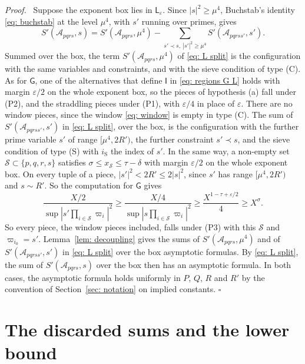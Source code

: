 \documentclass{article}
\numberwithin{equation}{section}
\newenvironment{proof}[1][Proof]{\par\medskip\noindent\textit{#1.}\ }{\hfill$\square$\par\medskip}
\newcommand{\Le}{\leqslant}
\newcommand{\Ge}{\geqslant}
\begin{document}
\begin{proof}
Suppose the exponent box lies in $\mathsf{L}_\varepsilon$. Since $|s|^2 \Ge \mu^4$, Buchstab's identity \eqref{eq: buchstab} at the level $\mu^4$, with $s'$ running over primes, gives
\begin{equation}
\label{eq: L split}
S'(\mathcal{A}_{pqrs}, s) = S'(\mathcal{A}_{pqrs}, \mu^4) - \sum_{s' \prec s,\ |s'|^2 \Ge \mu^4} S'(\mathcal{A}_{pqrss'}, s').
\end{equation}
Summed over the box, the term $S'(\mathcal{A}_{pqrs}, \mu^4)$ of \eqref{eq: L split} is the configuration with the same variables and constraints, and with the sieve condition of type (C). As for $\mathsf{G}$, one of the alternatives that define $\mathsf{I}$ in \eqref{eq: regions G L} holds with margin $\varepsilon/2$ on the whole exponent box, so the pieces of hypothesis (a) fall under (P2), and the straddling pieces under (P1), with $\varepsilon/4$ in place of $\varepsilon$. There are no window pieces, since the window \eqref{eq: window} is empty in type (C). The sum of $S'(\mathcal{A}_{pqrss'}, s')$ in \eqref{eq: L split}, over the box, is the configuration with the further prime variable $s'$ of range $[\mu^4, 2R')$, the further constraint $s' \prec s$, and the sieve condition of type (S) with $i_{\mathrm{S}}$ the index of $s'$. In the same way, a non-empty set $\mathcal{S} \subset \{p, q, r, s\}$ satisfies $\sigma \Le x_{\mathcal{S}} \Le \tau - \delta$ with margin $\varepsilon/2$ on the whole exponent box. On every tuple of a piece, $|s'|^2 < 2R' \Le 2|s|^2$, since $s'$ has range $[\mu^4, 2R')$ and $s \sim R'$. So the computation for $\mathsf{G}$ gives
\begin{equation*}
\frac{X/2}{\sup|s' \prod_{i \in \mathcal{S}} \varpi_i|^2} \Ge \frac{X/4}{\sup|s \prod_{i \in \mathcal{S}} \varpi_i|^2} \Ge \frac{X^{1 - \tau + \varepsilon/2}}{4} \Ge X^{\sigma}.
\end{equation*}
So every piece, the window pieces included, falls under (P3) with this $\mathcal{S}$ and $\varpi_{i_0} = s'$. Lemma~\ref{lem: decoupling} gives the sums of $S'(\mathcal{A}_{pqrs}, \mu^4)$ and of $S'(\mathcal{A}_{pqrss'}, s')$ in \eqref{eq: L split} over the box asymptotic formulas. By \eqref{eq: L split}, the sum of $S'(\mathcal{A}_{pqrs}, s)$ over the box then has an asymptotic formula. In both cases, the asymptotic formula holds uniformly in $P$, $Q$, $R$ and $R'$ by the convention of Section~\ref{sec: notation} on implied constants.
\end{proof}

\section{The discarded sums and the lower bound}
\label{sec: integrals}
\end{document}
